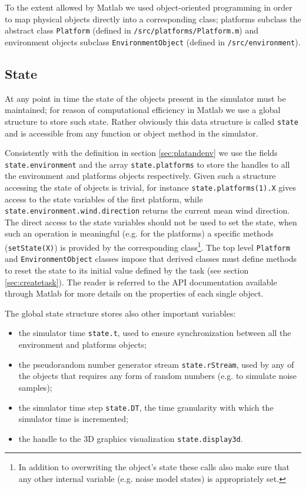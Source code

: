 \documentclass[a4paper,11pt]{report}
\begin{document}
To the extent allowed by Matlab we used object-oriented programming in order to map physical objects directly into a corresponding class; platforms subclass the abstract class \texttt{Platform} (defined in \texttt{/src/platforms/Platform.m}) and environment objects subclass \texttt{EnvironmentObject} (defined in \texttt{/src/environment}).

\subsection{State}\label{sec:state}

At any point in time the state of the objects present in the simulator must be maintained; for reason of computational efficiency in Matlab we use a global structure to store such state. Rather obviously this data structure is called \texttt{state} and is accessible from any function or object method in the simulator.

Consistently with the definition in section \ref{sec:platandenv} we use the fields \texttt{state.environment} and the array \texttt{state.platforms} to store the handles to all the environment and platforms objects respectively. 
Given such a structure accessing the state of objects is trivial, for instance \texttt{state.platforms(1).X} gives access to the state variables of the first platform, while \texttt{state.environment.wind.direction} returns the current mean wind direction. 
The direct access to the state variables should not be used to set the state, when such an operation is meaningful (e.g. for the platforms) a specific methods (\texttt{setState(X)}) is provided by the corresponding class\footnote{In addition to overwriting the object's state these calls also make sure that 
any other internal variable (e.g. noise model states) is appropriately set.}.
The top level \texttt{Platform} and \texttt{EnvironmentObject} classes impose that derived classes must define methods to reset the state to its initial value defined by the task (see section \ref{sec:createtask}).
The reader is referred to the API documentation available through Matlab for more details on the properties of each single object.

The global state structure stores also other important variables:
\begin{itemize}
 \item the simulator time \texttt{state.t}, used to ensure synchronization between all the environment and platforms objects;
 \item the pseudorandom number generator stream \texttt{state.rStream}, used by any of the objects that requires any form of random numbers (e.g. to simulate noise samples);
 \item the simulator time step \texttt{state.DT}, the time granularity with which the simulator time is incremented;
 \item the handle to the 3D graphics visualization \texttt{state.display3d}.
\end{itemize}
\end{document}
